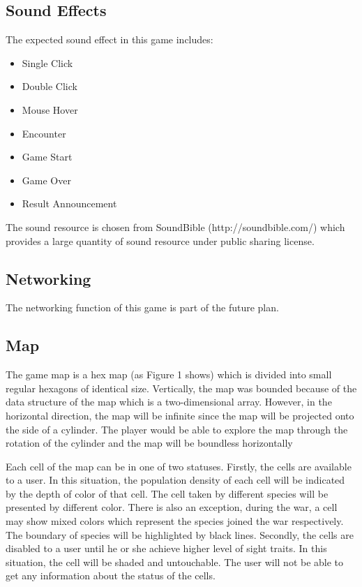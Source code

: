 	\subsection{Sound Effects}
	The expected sound effect in this game includes:
	\begin{itemize}
		\item Single Click
		\item Double Click
		\item Mouse Hover
		\item Encounter
		\item Game Start
		\item Game Over
		\item Result Announcement 
	\end{itemize}
	The sound resource is chosen from SoundBible (http://soundbible.com/) which provides a large quantity of sound resource under public sharing license.
	
	\subsection{Networking}
	The networking function of this game is part of the future plan.
	\subsection{Map}
	The game map is a hex map (as Figure 1 shows) which is divided into small regular hexagons of identical size. Vertically, the map was bounded because of the data structure of the map which is a two-dimensional array. However, in the horizontal direction, the map will be infinite since the map will be projected onto the side of a cylinder. The player would be able to explore the map through the rotation of the cylinder and the map will be boundless horizontally

	Each cell of the map can be in one of two statuses. Firstly, the cells are available to a user. In this situation, the population density of each cell will be indicated by the depth of color of that cell. The cell taken by different species will be presented by different color. There is also an exception, during the war, a cell may show mixed colors which represent the species joined the war respectively. The boundary of species will be highlighted by black lines. Secondly, the cells are disabled to a user until he or she achieve higher level of sight traits. In this situation, the cell will be shaded and untouchable. The user will not be able to get any information about the status of the cells.
	

